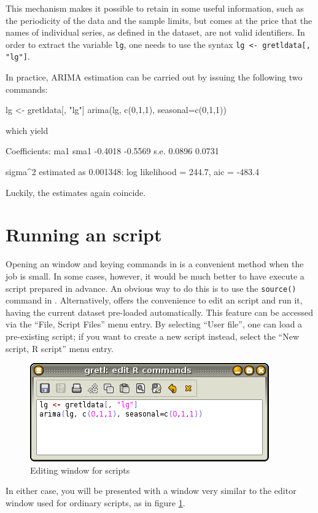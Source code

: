 This mechanism makes it possible to retain in  some useful
information, such as the periodicity of the data and the sample
limits, but comes at the price that the names of individual series, as
defined in the  dataset, are not valid identifiers. In
order to extract the variable \texttt{lg}, one needs to use the syntax
\verb|lg <- gretldata[, "lg"]|.

In practice, ARIMA estimation can be carried out by issuing the
following two  commands:
\begin{code}
lg <- gretldata[, "lg"]
arima(lg, c(0,1,1), seasonal=c(0,1,1))
\end{code}

which yield

\begin{code}
Coefficients:
          ma1     sma1
      -0.4018  -0.5569
s.e.   0.0896   0.0731

sigma^2 estimated as 0.001348:  log likelihood = 244.7,  aic = -483.4
\end{code}

Luckily, the estimates again coincide.

\section{Running an  script}
\label{sec:R-scripts}

Opening an  window and keying commands in is a convenient method when
the job is small. In some cases, however, it would be much better to
have  execute a script prepared in advance. An obvious way to
do this is to use the \texttt{source()} command in
. Alternatively,  offers the convenience to edit an
 script and run it, having the current dataset pre-loaded
automatically. This feature can be accessed via the ``File, Script
Files'' menu entry. By selecting ``User file'', one can load a
pre-existing  script; if you want to create a new script
instead, select the ``New script, R script'' menu entry.

\begin{figure}[htbp]
  \centering
  \includegraphics[scale=0.7]{figures/R-edit1}
  \caption{Editing window for  scripts}
  \label{fig:R-edit1}
\end{figure}
In either case, you will be presented with a window very similar to
the editor window used for ordinary  scripts, as in figure
\ref{fig:R-edit1}. 

